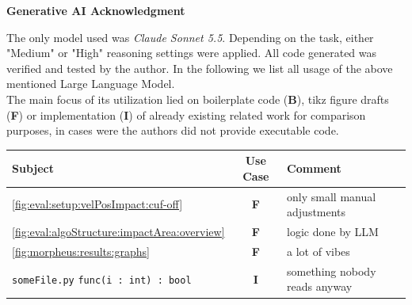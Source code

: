 \begin{huge}
  \textbf{Generative AI Acknowledgment}\ \\
\end{huge}
\vspace{1cm}

The only model used was \textit{Claude Sonnet 5.5}.
Depending on the task, either "Medium" or "High" reasoning settings were applied.
All code generated was verified and tested by the author.
In the following we list all usage of the above mentioned Large Language Model.
\\
The main focus of its utilization lied on boilerplate code (\textbf{B}), tikz figure drafts (\textbf{F}) or implementation (\textbf{I}) of already existing related work for comparison purposes, in cases were the authors did not provide executable code.
\vspace{3em}
\begin{table}[H]
  \centering
  \begin{tabularx}{\textwidth}{p{} c l}
    \toprule
    \textbf{Subject} & \textbf{Use Case} & \multicolumn{1}{X}{\textbf{Comment}} \\
    \midrule
      \cref{fig:eval:setup:velPosImpact:cuf-off} & \textbf{F} & only small manual adjustments \\
      \cref{fig:eval:algoStructure:impactArea:overview} & \textbf{F} & logic done by LLM \\
      \cref{fig:morpheus:results:graphs} & \textbf{F} & a lot of vibes \\
      \verb|someFile.py| \newline  \verb|func(i : int) : bool| & \textbf{I} & something nobody reads anyway \\
    \bottomrule
  \end{tabularx}
\end{table}
